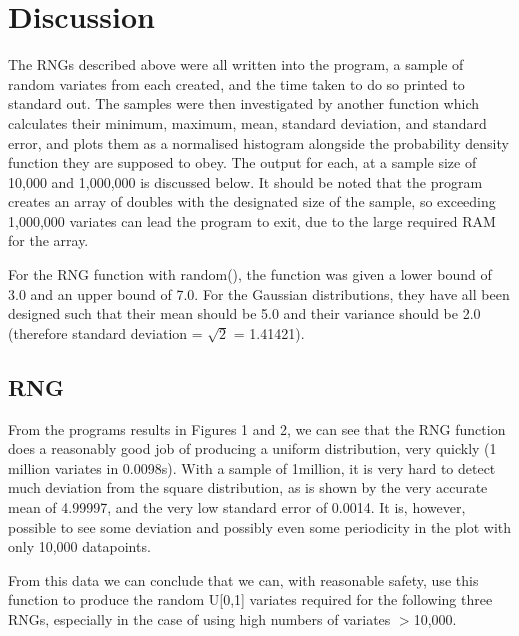 \documentclass{article}
\begin{document}
\section{Discussion}

The RNGs described above were all written into the program, a sample of random variates from each created, and the time taken to do so printed to standard out. The samples were then investigated by another function which calculates their minimum, maximum, mean, standard deviation, and standard error, and plots them as a normalised histogram alongside the probability density function they are supposed to obey. The output for each, at a sample size of 10,000 and 1,000,000 is discussed below. It should be noted that the program creates an array of doubles with the designated size of the sample, so exceeding 1,000,000 variates can lead the program to exit, due to the large required RAM for the array.

For the RNG function with random(), the function was given a lower bound of 3.0 and an upper bound of 7.0. For the Gaussian distributions, they have all been designed such that their mean should be 5.0 and their variance should be 2.0 (therefore standard deviation = $\sqrt{2}$ = 1.41421).





\subsection{RNG}

From the programs results in Figures 1 and 2, we can see that the RNG function does a reasonably good job of producing a uniform distribution, very quickly (1 million variates in 0.0098s). With a sample of 1million, it is very hard to detect much deviation from the square distribution, as is shown by the very accurate mean of 4.99997, and the very low standard error of 0.0014. It is, however, possible to see some deviation and possibly even some periodicity in the plot with only 10,000 datapoints.

From this data we can conclude that we can, with reasonable safety, use this function to produce the random U[0,1] variates required for the following three RNGs, especially in the case of using high numbers of variates $>$10,000.

\begin{figure}[htb]
\end{figure}
\end{document}
